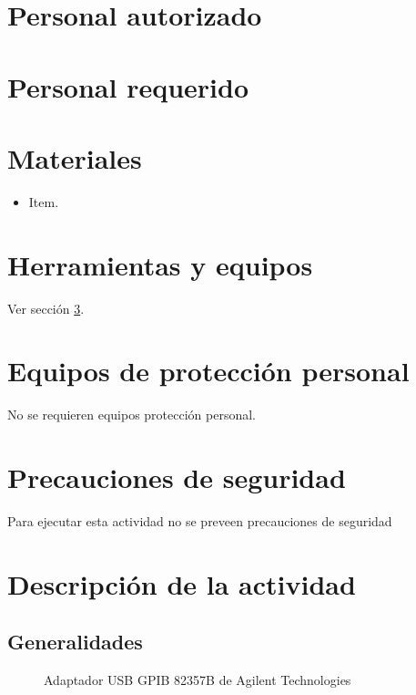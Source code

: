 \documentclass[paper=letter,oneside,fontsize=11pt, parskip=full]{scrartcl}
\begin{document}
	\section{Personal autorizado}	
	
		
	\section{Personal requerido}	

		
	\section{Materiales}
		\label{Sec:SeccionMateriales}
		\begin{itemize}
			\item Item.
		\end{itemize}	
			
	\section{Herramientas y equipos}
		
		Ver sección \ref{Sec:SeccionMateriales}.

	
	\section{Equipos de protección personal}
	
		No se requieren equipos protección personal.
		
	\section{Precauciones de seguridad}
	
		Para ejecutar esta actividad no se preveen precauciones de seguridad
		
	\section{Descripción de la actividad}
	
		\subsection{Generalidades}
	

		
		\begin{figure}[!h]
			\begin{center}
				\caption{Adaptador USB GPIB 82357B de Agilent Technologies}
				\label{Fig:AdaptadorGpibUsb}
			\end{center}
		\end{figure}	
		
\end{document}
